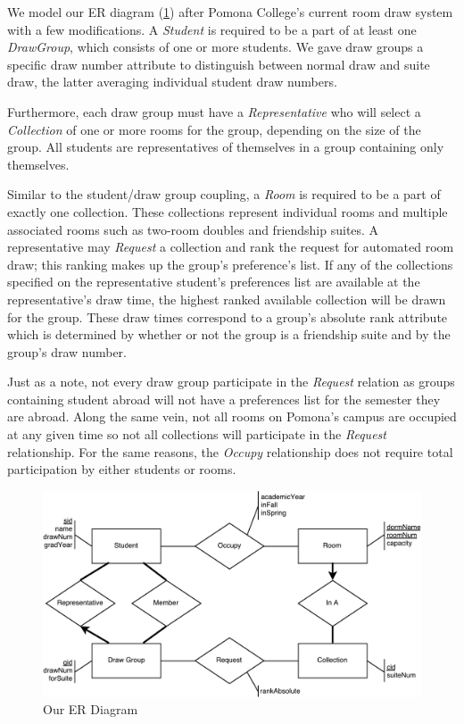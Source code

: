 We model our ER diagram (\cref{fig:er-diagram}) after Pomona College's current
room draw system with a few modifications. A \emph{Student} is required to be
a part of at least one \emph{DrawGroup}, which consists of one or more
students. We gave draw groups a specific draw number attribute to distinguish
between normal draw and suite draw, the latter averaging individual student draw
numbers.

Furthermore, each draw group must have a \emph{Representative} who
will select a \emph{Collection} of one or more rooms for the group, depending
on the size of the group. All students are representatives of themselves in a
group containing only themselves.

Similar to the student/draw group coupling, a
\emph{Room} is required to be a part of exactly one collection. These
collections represent individual rooms and multiple associated rooms such as
two-room doubles and friendship suites. A representative may \emph{Request} a
collection and rank the request for automated room draw; this ranking makes up
the group's preference's list. If any of the collections specified on the
representative student's preferences list are available at the representative's
draw time, the highest ranked available collection will be drawn for the group.
These draw times correspond to a group's absolute rank attribute which is
determined by whether or not the group is a friendship suite and by the group's
draw number.

Just as a note, not every draw group participate in the \emph{Request
} relation as groups containing student abroad will not have a preferences list
for the semester they are abroad. Along the same vein, not all rooms on Pomona's
campus are occupied at any given time so not all collections will participate in the \emph{Request} relationship. For the same reasons, the \emph{Occupy} relationship does not require total participation by either students or rooms.

\begin{figure}[H] \centering
\includegraphics[width=\textwidth]{er_crop.pdf}
\caption{Our ER Diagram}
\label{fig:er-diagram}
\end{figure}
